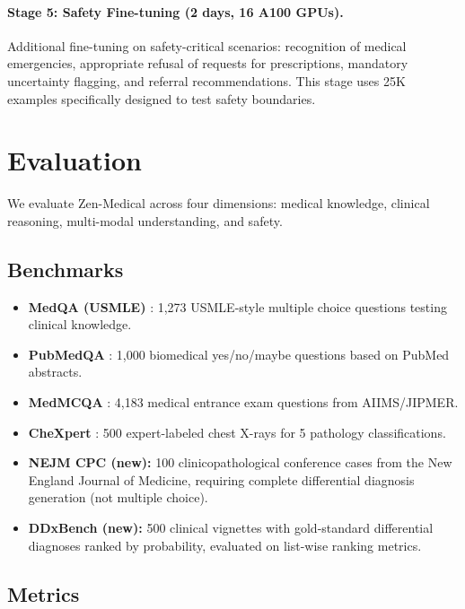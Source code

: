 \documentclass[11pt,a4paper]{article}
\begin{document}
\paragraph{Stage 5: Safety Fine-tuning (2 days, 16 A100 GPUs).} Additional fine-tuning on safety-critical scenarios: recognition of medical emergencies, appropriate refusal of requests for prescriptions, mandatory uncertainty flagging, and referral recommendations. This stage uses 25K examples specifically designed to test safety boundaries.

\section{Evaluation}
\label{sec:evaluation}

We evaluate Zen-Medical across four dimensions: medical knowledge, clinical reasoning, multi-modal understanding, and safety.

\subsection{Benchmarks}

\begin{itemize}
    \item \textbf{MedQA (USMLE)} \citep{jin2021disease}: 1,273 USMLE-style multiple choice questions testing clinical knowledge.
    \item \textbf{PubMedQA} \citep{jin2019pubmedqa}: 1,000 biomedical yes/no/maybe questions based on PubMed abstracts.
    \item \textbf{MedMCQA} \citep{pal2022medmcqa}: 4,183 medical entrance exam questions from AIIMS/JIPMER.
    \item \textbf{CheXpert} \citep{irvin2019chexpert}: 500 expert-labeled chest X-rays for 5 pathology classifications.
    \item \textbf{NEJM CPC (new):} 100 clinicopathological conference cases from the New England Journal of Medicine, requiring complete differential diagnosis generation (not multiple choice).
    \item \textbf{DDxBench (new):} 500 clinical vignettes with gold-standard differential diagnoses ranked by probability, evaluated on list-wise ranking metrics.
\end{itemize}

\subsection{Metrics}
\end{document}

